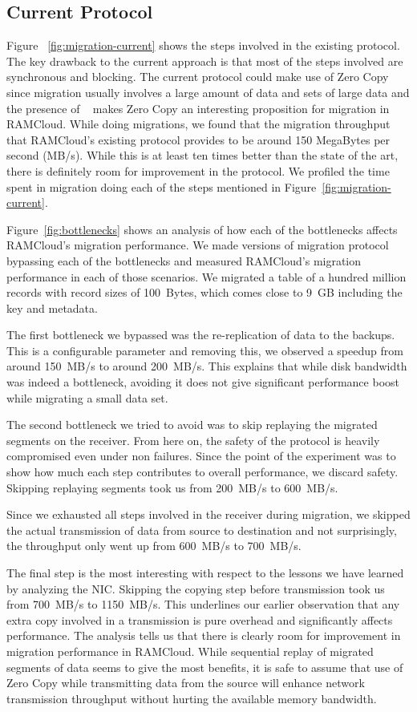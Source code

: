 \subsection{Current Protocol}
Figure ~\ref{fig:migration-current} shows the steps involved in the existing protocol. The key drawback to the current approach is that 
most of the steps involved are synchronous and blocking. The current protocol could make use of Zero Copy since migration usually involves a 
large amount of data and sets of large data and the presence of ~\cite{ramcloudtx} makes Zero Copy an interesting proposition 
for migration in RAMCloud. While doing migrations, we found that the migration throughput that RAMCloud's existing protocol provides to 
be around 150 MegaBytes per second (MB/s). While this is at least ten times better than the state of the art, there is definitely room for improvement in the protocol.
We profiled the time spent in migration doing each of the steps mentioned in Figure~\ref{fig:migration-current}.

Figure~\ref{fig:bottlenecks} shows an analysis of how each of the bottlenecks affects RAMCloud's migration performance. We made versions of migration 
protocol bypassing each of the bottlenecks and measured RAMCloud's migration performance in each of those scenarios. We migrated a table of a hundred million 
records with record sizes of 100~Bytes, which comes close to 9~GB including the key and metadata.

The first bottleneck we bypassed was the re-replication of data to the backups. This is a configurable parameter and removing this, we observed a speedup from around 150~MB/s to around 
200~MB/s. This explains that while disk bandwidth was indeed a bottleneck, avoiding it does not give significant performance boost while migrating a small data set.

The second bottleneck we tried to avoid was to skip replaying the migrated segments on the receiver. From here on, the safety of the protocol is heavily compromised even under 
 non failures. Since the point of the experiment was to show how much each step contributes to overall performance, we discard safety. Skipping replaying segments took us from 
 200~MB/s to 600~MB/s. 

Since we exhausted all steps involved in the receiver during migration, we skipped the actual transmission of data from source to destination and not surprisingly, the throughput 
only went up from 600~MB/s to 700~MB/s. 

The final step is the most interesting with respect to the lessons we have learned by analyzing the NIC. Skipping the copying step before transmission took us from 700~MB/s to 
1150~MB/s. This underlines our earlier observation that any extra copy involved in a transmission is pure overhead and significantly affects performance. 
The analysis tells us that there is clearly room for improvement in migration performance in RAMCloud. While sequential replay of migrated segments of data seems to give the most benefits, 
it is safe to assume that use of Zero Copy while transmitting data from the source will enhance network transmission throughput without hurting the available memory bandwidth.

